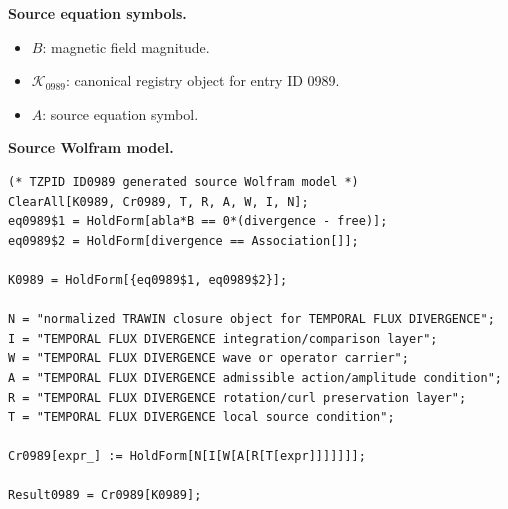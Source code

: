 \begin{minipage}[t]{0.49\linewidth}
\begingroup
\small
\raggedright
\textbf{Source equation symbols.}\par
\begin{itemize}[leftmargin=1.35em,itemsep=1pt,topsep=1pt,parsep=0pt]
    \item $B$: magnetic field magnitude.
    \item $\mathcal{K}_{0989}$: canonical registry object for entry ID 0989.
    \item $A$: source equation symbol.
\end{itemize}
\endgroup
\end{minipage}\hfill
\begin{minipage}[t]{0.47\linewidth}
\begingroup
\scriptsize
\raggedright
\textbf{Source Wolfram model.}\par
\begin{Verbatim}[fontsize=\tiny,breaklines=true,breakanywhere=true]
(* TZPID ID0989 generated source Wolfram model *)
ClearAll[K0989, Cr0989, T, R, A, W, I, N];
eq0989$1 = HoldForm[abla*B == 0*(divergence - free)];
eq0989$2 = HoldForm[divergence == Association[]];

K0989 = HoldForm[{eq0989$1, eq0989$2}];

N = "normalized TRAWIN closure object for TEMPORAL FLUX DIVERGENCE";
I = "TEMPORAL FLUX DIVERGENCE integration/comparison layer";
W = "TEMPORAL FLUX DIVERGENCE wave or operator carrier";
A = "TEMPORAL FLUX DIVERGENCE admissible action/amplitude condition";
R = "TEMPORAL FLUX DIVERGENCE rotation/curl preservation layer";
T = "TEMPORAL FLUX DIVERGENCE local source condition";

Cr0989[expr_] := HoldForm[N[I[W[A[R[T[expr]]]]]]];

Result0989 = Cr0989[K0989];
\end{Verbatim}
\endgroup
\end{minipage}

